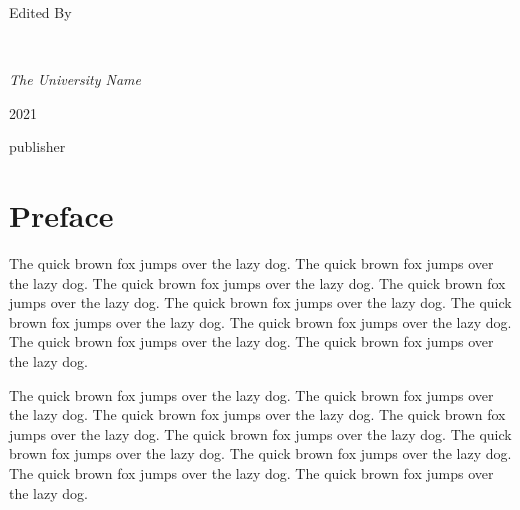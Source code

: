 \documentclass[openany,twoside,12pt]{book}
\theoremstyle{plain}
\numberwithin{equation}{chapter}
\numberwithin{figure}{chapter}
\numberwithin{table}{chapter}
\newcommand{\plogo}{\fbox{$\mathcal{PL}$}} %
\begin{document}
\begin{titlepage}
	
	Edited By
	
	\vspace{0.5\baselineskip} %
	
	{\scshape\Large \@author \\} %
	
	\vspace{0.5\baselineskip} %
	
	\textit{The University Name} %
	
	\vfill %
	
    \makeatletter

	
	\plogo %
	
	\vspace{0.3\baselineskip} %
	
	2021 %

	{\large publisher} %

\end{titlepage}





\thispagestyle{empty}

\frontmatter


\chapter{Preface}

The quick brown fox jumps over the lazy dog. The quick brown fox jumps over the lazy dog. The quick brown fox jumps over the lazy dog. The quick brown fox jumps over the lazy dog. The quick brown fox jumps over the lazy dog. The quick brown fox jumps over the lazy dog. The quick brown fox jumps over the lazy dog. The quick brown fox jumps over the lazy dog. The quick brown fox jumps over the lazy dog.


The quick brown fox jumps over the lazy dog. The quick brown fox jumps over the lazy dog. The quick brown fox jumps over the lazy dog. The quick brown fox jumps over the lazy dog. The quick brown fox jumps over the lazy dog. The quick brown fox jumps over the lazy dog. The quick brown fox jumps over the lazy dog. The quick brown fox jumps over the lazy dog. The quick brown fox jumps over the lazy dog.
\end{document}
